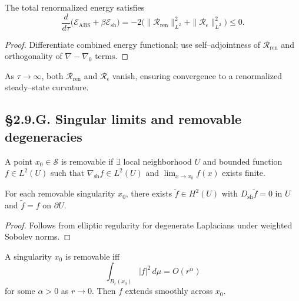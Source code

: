 \begin{theorem}\label{thm:2.9.balance}
The total renormalized energy satisfies
\[
\frac{d}{d\tau}\big(\mathcal{E}_{\mathrm{ABS}}+\beta\mathcal{E}_{\mathrm{sh}}\big)
=-2\big(\|\mathcal{R}_{\mathrm{ren}}\|_{L^2}^2+\|\mathcal{R}_\epsilon\|_{L^2}^2\big)\le0.
\]
\]
\end{theorem}

\begin{proof}
Differentiate combined energy functional; use self–adjointness of $\mathcal{R}_{\mathrm{ren}}$
and orthogonality of $\nabla-\nabla_0$ terms.
\end{proof}

\begin{corollary}
As $\tau\to\infty$, both $\mathcal{R}_{\mathrm{ren}}$ and $\mathcal{R}_\epsilon$ vanish,
ensuring convergence to a renormalized steady–state curvature.
\end{corollary}

\subsection*{§2.9.G. Singular limits and removable degeneracies}

\begin{definition}
A point $x_0\in\mathcal{S}$ is removable if $\exists$ local neighborhood $U$
and bounded function $f\in L^2(U)$ such that $\nabla_{\mathrm{sh}}f\in L^2(U)$
and $\lim_{x\to x_0}f(x)$ exists finite.
\]
\end{definition}

\begin{lemma}
For each removable singularity $x_0$, there exists $\tilde{f}\in H^2(U)$ with
$D_{\mathrm{sh}}\tilde{f}=0$ in $U$ and $\tilde{f}=f$ on $\partial U$.
\end{lemma}

\begin{proof}
Follows from elliptic regularity for degenerate Laplacians under weighted Sobolev norms.
\end{proof}

\begin{theorem}\label{thm:2.9.removable}
A singularity $x_0$ is removable iff
\[
\int_{B_r(x_0)} |f|^2\,d\mu = O(r^\alpha)
\]
for some $\alpha>0$ as $r\to0$.  
Then $f$ extends smoothly across $x_0$.
\end{theorem}

